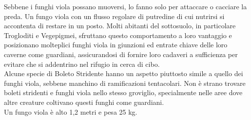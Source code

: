 \begin{multicols}{2}
Sebbene i funghi viola possano muoversi, lo fanno solo per attaccare o cacciare la preda. Un fungo viola con un flusso regolare di putredine di cui nutrirsi si accontenta di restare in un posto. Molti abitanti del sottosuolo, in particolare Trogloditi e Vegepigmei, sfruttano questo comportamento a loro vantaggio e posizionano molteplici funghi viola in giunzioni ed entrate chiave delle loro caverne come guardiani, assicurandosi di fornire loro cadaveri a sufficienza per evitare che si addentrino nel rifugio in cerca di cibo.\\
Alcune specie di Boleto Stridente hanno un aspetto piuttosto simile a quello dei funghi viola, sebbene manchino di ramificazioni tentacolari. Non è strano trovare boleti stridenti e funghi viola nello stesso groviglio, specialmente nelle aree dove altre creature coltivano questi funghi come guardiani.\\

Un fungo viola è alto 1,2 metri e pesa 25 kg.\\


\end{multicols}
